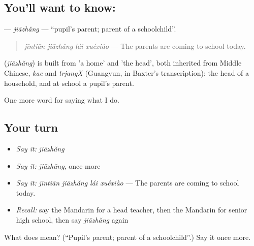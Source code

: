 \subsection*{You'll want to know: }
\textbf{} — \emph{jiāzhǎng} — \textquotedblleft{}pupil's parent; parent of a schoolchild\textquotedblright{}.

\begin{quote}
\textbf{} \emph{jīntiān jiāzhǎng lái xuéxiào} — The parents are coming to school today.
\end{quote}

\begin{cousinweb}
\textbf{} (\emph{jiāzhǎng}) is built from  'a home' and  'the head', both inherited from Middle Chinese, \emph{kae} and \emph{trjangX} (Guangyun, in Baxter's transcription): the head of a household, and at school a pupil's parent.
\end{cousinweb}

\begin{grammarlens}[title={What you've built}]
One more word for saying what I do.
\end{grammarlens}

\subsection*{Your turn}
\begin{itemize}
\raggedright
  \item \emph{Say it:} \emph{jiāzhǎng}
  \item \emph{Say it:} \emph{jiāzhǎng}, once more
  \item \emph{Say it:} \emph{jīntiān jiāzhǎng lái xuéxiào} — The parents are coming to school today.
  \item \emph{Recall:} say the Mandarin for a head teacher, then the Mandarin for senior high school, then say \emph{jiāzhǎng} again
\end{itemize}

\begin{tcolorbox}[breakable,colback=teal!4,colframe=teal!35!black,title={Before you move on}]
What does  mean? (\textquotedblleft{}Pupil's parent; parent of a schoolchild\textquotedblright{}.) Say it once more.
\end{tcolorbox}

